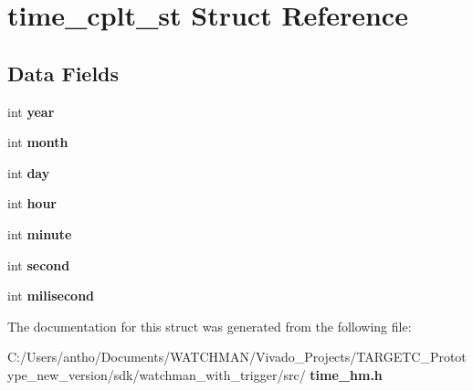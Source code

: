 \section{time\+\_\+cplt\+\_\+st Struct Reference}
\label{structtime__cplt__st}
\subsection*{Data Fields}
\begin{DoxyCompactItemize}
\item 
\mbox{\label{structtime__cplt__st_abeac221e38b7b9ce7df8722c842bf671}} 
int {\bfseries year}
\item 
\mbox{\label{structtime__cplt__st_aedb06abe5aff12fa3e7e0e71a374edfb}} 
int {\bfseries month}
\item 
\mbox{\label{structtime__cplt__st_a4c11afc03fc3ee49bab660def6558f2a}} 
int {\bfseries day}
\item 
\mbox{\label{structtime__cplt__st_a15df9ba285cfd842f284025f904edc9c}} 
int {\bfseries hour}
\item 
\mbox{\label{structtime__cplt__st_a5edffad982a0566ad01d95005474eae3}} 
int {\bfseries minute}
\item 
\mbox{\label{structtime__cplt__st_a6cf35be1947a62f134392fcb1b3c54d2}} 
int {\bfseries second}
\item 
\mbox{\label{structtime__cplt__st_a5bfdb00d070117e7a6411f7e51269153}} 
int {\bfseries milisecond}
\end{DoxyCompactItemize}


The documentation for this struct was generated from the following file\+:\begin{DoxyCompactItemize}
\item 
C\+:/\+Users/antho/\+Documents/\+W\+A\+T\+C\+H\+M\+A\+N/\+Vivado\+\_\+\+Projects/\+T\+A\+R\+G\+E\+T\+C\+\_\+\+Prototype\+\_\+new\+\_\+version/sdk/watchman\+\_\+with\+\_\+trigger/src/\textbf{ time\+\_\+hm.\+h}\end{DoxyCompactItemize}
